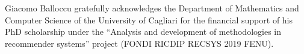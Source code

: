 \documentclass[sigconf]{acmart}
\begin{document}
\begin{acks}
Giacomo Balloccu gratefully acknowledges the Department of Mathematics and Computer Science of the University of Cagliari for the financial support of his PhD scholarship under the ``Analysis and development of methodologies in recommender systems'' project (FONDI RICDIP RECSYS 2019 FENU).
\end{acks}
\balance


\end{document}
